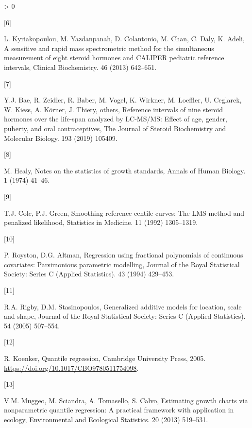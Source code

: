 \documentclass[]{elsarticle} %
\newlength{\csllabelwidth}
\newlength{\cslhangindent}
\newenvironment{CSLReferences}[3] %
 {%
  \setlength{\parindent}{0pt}
  \ifodd #1 \everypar{\setlength{\hangindent}{\cslhangindent}}\ignorespaces\fi
  \ifnum #2 > 0
  \setlength{\parskip}{#2\baselineskip}
  \fi
 }%
 {}
\newcommand{\CSLLeftMargin}[1]{\parbox[t]{\csllabelwidth}{#1}}
\newcommand{\CSLRightInline}[1]{\parbox[t]{\linewidth - \csllabelwidth}{#1}}
\begin{document}
\begin{CSLReferences}{0}{0}
\leavevmode\hypertarget{ref-kyriakopoulou2013sensitive}{}%
\CSLLeftMargin{{[}6{]} }
\CSLRightInline{L. Kyriakopoulou, M. Yazdanpanah, D. Colantonio, M.
Chan, C. Daly, K. Adeli, A sensitive and rapid mass spectrometric method
for the simultaneous measurement of eight steroid hormones and CALIPER
pediatric reference intervals, Clinical Biochemistry. 46 (2013)
642--651.}

\leavevmode\hypertarget{ref-bae2019reference}{}%
\CSLLeftMargin{{[}7{]} }
\CSLRightInline{Y.J. Bae, R. Zeidler, R. Baber, M. Vogel, K. Wirkner, M.
Loeffler, U. Ceglarek, W. Kiess, A. Körner, J. Thiery, others, Reference
intervals of nine steroid hormones over the life-span analyzed by
LC-MS/MS: Effect of age, gender, puberty, and oral contraceptives, The
Journal of Steroid Biochemistry and Molecular Biology. 193 (2019)
105409.}

\leavevmode\hypertarget{ref-healy1974notes}{}%
\CSLLeftMargin{{[}8{]} }
\CSLRightInline{M. Healy, Notes on the statistics of growth standards,
Annals of Human Biology. 1 (1974) 41--46.}

\leavevmode\hypertarget{ref-cole1992smoothing}{}%
\CSLLeftMargin{{[}9{]} }
\CSLRightInline{T.J. Cole, P.J. Green, Smoothing reference centile
curves: The LMS method and penalized likelihood, Statistics in Medicine.
11 (1992) 1305--1319.}

\leavevmode\hypertarget{ref-royston1994regression}{}%
\CSLLeftMargin{{[}10{]} }
\CSLRightInline{P. Royston, D.G. Altman, Regression using fractional
polynomials of continuous covariates: Parsimonious parametric modelling,
Journal of the Royal Statistical Society: Series C (Applied Statistics).
43 (1994) 429--453.}

\leavevmode\hypertarget{ref-rigby2005generalized}{}%
\CSLLeftMargin{{[}11{]} }
\CSLRightInline{R.A. Rigby, D.M. Stasinopoulos, Generalized additive
models for location, scale and shape, Journal of the Royal Statistical
Society: Series C (Applied Statistics). 54 (2005) 507--554.}

\leavevmode\hypertarget{ref-koenker_2005}{}%
\CSLLeftMargin{{[}12{]} }
\CSLRightInline{R. Koenker, Quantile regression, Cambridge University
Press, 2005. \url{https://doi.org/10.1017/CBO9780511754098}.}

\leavevmode\hypertarget{ref-muggeo2013estimating}{}%
\CSLLeftMargin{{[}13{]} }
\CSLRightInline{V.M. Muggeo, M. Sciandra, A. Tomasello, S. Calvo,
Estimating growth charts via nonparametric quantile regression: A
practical framework with application in ecology, Environmental and
Ecological Statistics. 20 (2013) 519--531.}


\end{CSLReferences}
\end{document}
